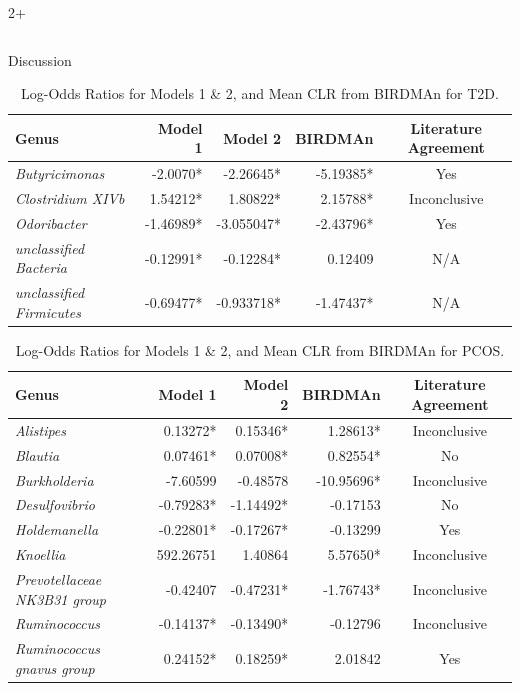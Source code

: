 \documentclass[final]{beamer}
\newlength{\sepwidth}
\newlength{\colwidth}
\begin{document}
\begin{frame}[t]
\begin{columns}[t]
\begin{column}{2\colwidth + \sepwidth}
\begin{columns}[t]
\begin{column}{\colwidth}
\begin{block}{Discussion}
      \begin{table}
        
        \centering
        \begin{tabular}{l r r r c}
          \toprule
          \textbf{Genus} & \textbf{Model 1} & \textbf{Model 2} & \textbf{BIRDMAn} & \textbf{Literature Agreement} \\
          \midrule
          \textit{Butyricimonas} & -2.0070* & -2.26645* & -5.19385* & Yes \\
          \textit{Clostridium XIVb} & 1.54212* & 1.80822* & 2.15788* & Inconclusive \\
          \textit{Odoribacter} & -1.46989* & -3.055047* & -2.43796* & Yes \\
          \textit{unclassified Bacteria} & -0.12991* & -0.12284* & 0.12409 & N/A \\
          \textit{unclassified Firmicutes} & -0.69477* & -0.933718* & -1.47437* & N/A \\
          \bottomrule
        \end{tabular}
        \caption{Log-Odds Ratios for Models 1 \& 2, and Mean CLR from BIRDMAn for T2D.}
      \end{table}
      
      \begin{table}
        \centering
        \begin{tabular}{l r r r c}
          \toprule
          \textbf{Genus} & \textbf{Model 1} & \textbf{Model 2} & \textbf{BIRDMAn} & \textbf{Literature Agreement} \\
          \midrule
          \textit{Alistipes} & 0.13272* & 0.15346* & 1.28613* & Inconclusive \\
          \textit{Blautia} & 0.07461* & 0.07008* & 0.82554* & No \\
          \textit{Burkholderia} & -7.60599 & -0.48578 & -10.95696* & Inconclusive \\
          \textit{Desulfovibrio} & -0.79283* & -1.14492* & -0.17153 & No \\
          \textit{Holdemanella} & -0.22801* & -0.17267* & -0.13299 & Yes \\
          \textit{Knoellia} & 592.26751 & 1.40864 & 5.57650* & Inconclusive \\
          \textit{Prevotellaceae NK3B31 group} & -0.42407 & -0.47231* & -1.76743* & Inconclusive \\
          \textit{Ruminococcus} & -0.14137* & -0.13490* & -0.12796 & Inconclusive \\
          \textit{Ruminococcus gnavus group} & 0.24152* & 0.18259* & 2.01842 & Yes \\
          \bottomrule
        \end{tabular}
        \caption{Log-Odds Ratios for Models 1 \& 2, and Mean CLR from BIRDMAn for PCOS.}
      \end{table}
    \end{block}
    \end{column}


\end{columns}
\end{column}
\end{columns}
\end{frame}
\end{document}
